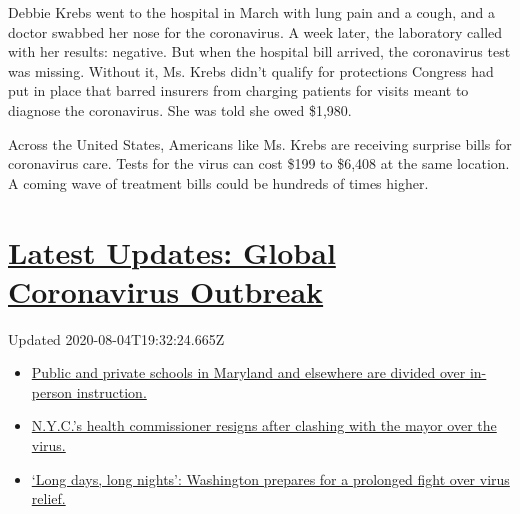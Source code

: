 Debbie Krebs went to the hospital in March with lung pain and a cough,
and a doctor swabbed her nose for the coronavirus. A week later, the
laboratory called with her results: negative. But when the hospital bill
arrived, the coronavirus test was missing. Without it, Ms. Krebs didn't
qualify for protections Congress had put in place that barred insurers
from charging patients for visits meant to diagnose the coronavirus. She
was told she owed \$1,980.

Across the United States, Americans like Ms. Krebs are receiving
surprise bills for coronavirus care. Tests for the virus can cost \$199
to \$6,408 at the same location. A coming wave of treatment bills could
be hundreds of times higher.

\hypertarget{latest-updates-global-coronavirus-outbreak}{%
\section{\texorpdfstring{\href{https://www.nytimes3xbfgragh.onion/2020/08/04/world/coronavirus-cases.html?action=click\&pgtype=Article\&state=default\&region=MAIN_CONTENT_1\&context=storylines_live_updates}{Latest
Updates: Global Coronavirus
Outbreak}}{Latest Updates: Global Coronavirus Outbreak}}\label{latest-updates-global-coronavirus-outbreak}}

Updated 2020-08-04T19:32:24.665Z

\begin{itemize}
\tightlist
\item
  \href{https://www.nytimes3xbfgragh.onion/2020/08/04/world/coronavirus-cases.html?action=click\&pgtype=Article\&state=default\&region=MAIN_CONTENT_1\&context=storylines_live_updates\#link-4825b93}{Public
  and private schools in Maryland and elsewhere are divided over
  in-person instruction.}
\item
  \href{https://www.nytimes3xbfgragh.onion/2020/08/04/world/coronavirus-cases.html?action=click\&pgtype=Article\&state=default\&region=MAIN_CONTENT_1\&context=storylines_live_updates\#link-4d1eafa8}{N.Y.C.'s
  health commissioner resigns after clashing with the mayor over the
  virus.}
\item
  \href{https://www.nytimes3xbfgragh.onion/2020/08/04/world/coronavirus-cases.html?action=click\&pgtype=Article\&state=default\&region=MAIN_CONTENT_1\&context=storylines_live_updates\#link-6b644638}{`Long
  days, long nights': Washington prepares for a prolonged fight over
  virus relief.}
\end{itemize}

